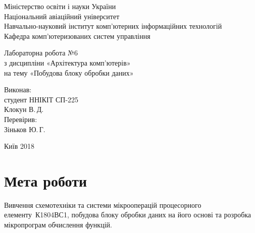 \documentclass[a4paper,oneside,DIV=12,12pt,headings=normal]{scrartcl}
\begin{document}
	\begin{titlepage}
	\centering
		Міністерство освіти і науки України\\
		Національний авіаційний університет\\
		Навчально-науковий інститут комп'ютерних інформаційних технологій\\
		Кафедра комп'ютеризованих систем управління

		\vspace*{\fill}

		Лабораторна робота №6\\
		з дисципліни «Архітектура комп'ютерів»\\
		на тему «Побудова блоку обробки даних»\\

		\vspace*{\fill}
		
		\begin{flushright}
			Виконав:\\
			студент ННІКІТ СП-225\\
			Клокун В.\,Д.\\
			Перевірив:\\
			Зіньков Ю.\,Г.
		\end{flushright}

		Київ 2018
    \end{titlepage}

		\section{Мета роботи}
			Вивчення схемотехніки та системи мікрооперацій процесорного елементу~К1804ВС1, побудова блоку обробки даних на його основі та розробка мікропрограм обчислення функцій.
\end{document}
